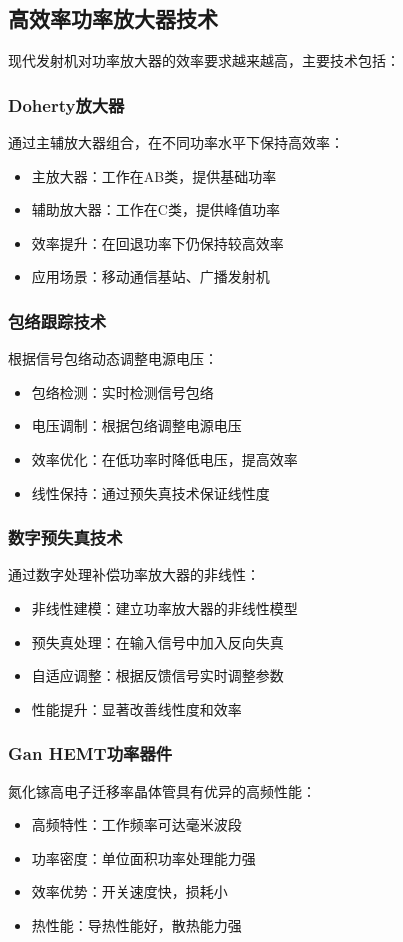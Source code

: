 \documentclass[12pt,UTF8]{ctexbook}
\begin{document}
\subsection{高效率功率放大器技术}

现代发射机对功率放大器的效率要求越来越高，主要技术包括：

\subsubsection{Doherty放大器}
通过主辅放大器组合，在不同功率水平下保持高效率：
\begin{itemize}[leftmargin=3.5em]
    \item 主放大器：工作在AB类，提供基础功率
    \item 辅助放大器：工作在C类，提供峰值功率
    \item 效率提升：在回退功率下仍保持较高效率
    \item 应用场景：移动通信基站、广播发射机
\end{itemize}

\subsubsection{包络跟踪技术}
根据信号包络动态调整电源电压：
\begin{itemize}[leftmargin=3.5em]
    \item 包络检测：实时检测信号包络
    \item 电压调制：根据包络调整电源电压
    \item 效率优化：在低功率时降低电压，提高效率
    \item 线性保持：通过预失真技术保证线性度
\end{itemize}

\subsubsection{数字预失真技术}
通过数字处理补偿功率放大器的非线性：
\begin{itemize}[leftmargin=3.5em]
    \item 非线性建模：建立功率放大器的非线性模型
    \item 预失真处理：在输入信号中加入反向失真
    \item 自适应调整：根据反馈信号实时调整参数
    \item 性能提升：显著改善线性度和效率
\end{itemize}

\subsubsection{Gan HEMT功率器件}
氮化镓高电子迁移率晶体管具有优异的高频性能：
\begin{itemize}[leftmargin=3.5em]
    \item 高频特性：工作频率可达毫米波段
    \item 功率密度：单位面积功率处理能力强
    \item 效率优势：开关速度快，损耗小
    \item 热性能：导热性能好，散热能力强
\end{itemize}
\end{document}
